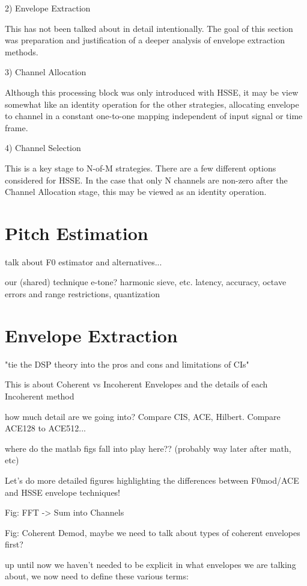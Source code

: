 \documentclass [11pt, proquest] {uwthesis}[2015/03/03]
\begin{document}
2) Envelope Extraction

This has not been talked about in detail intentionally.  The goal of this section was preparation and justification of a deeper analysis of envelope extraction methods.

3) Channel Allocation

Although this processing block was only introduced with HSSE, it may be view somewhat like an identity operation for the other strategies, allocating envelope to channel in a constant one-to-one mapping independent of input signal or time frame.

4) Channel Selection

This is a key stage to N-of-M strategies.  There are a few different options considered for HSSE.  In the case that only N channels are non-zero after the Channel Allocation stage, this may be viewed as an identity operation.

\section{Pitch Estimation}

talk about F0 estimator and alternatives...

	our (shared) technique
	e-tone? harmonic sieve, etc.
	latency, accuracy, octave errors and range restrictions,
	quantization

\section{Envelope Extraction}

"tie the DSP theory into the pros and cons and limitations of CIs"

This is about Coherent vs Incoherent Envelopes and the details of each Incoherent method

how much detail are we going into?  Compare CIS, ACE, Hilbert.  Compare ACE128 to ACE512...

where do the matlab figs fall into play here?? (probably way later after math, etc)

Let's do more detailed figures highlighting the differences between F0mod/ACE and HSSE envelope techniques!

Fig: FFT -> Sum into Channels

Fig: Coherent Demod, maybe we need to talk about types of coherent envelopes first?

up until now we haven't needed to be explicit in what envelopes we are talking about, we now need to define these various terms:
\end{document}
